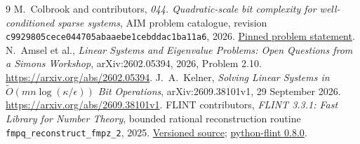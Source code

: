 \documentclass[11pt]{article}
\newcommand{\softO}{\widetilde O}
\begin{document}
\begin{thebibliography}{9}
M.~Colbrook and contributors,
\emph{044. Quadratic-scale bit complexity for well-conditioned sparse systems},
AIM problem catalogue, revision
\texttt{c9929805cece044705abaaebe1cebddac1ba11a6}, 2026.
\href{https://github.com/MColbrook/AIM/blob/c9929805cece044705abaaebe1cebddac1ba11a6/problems/044-sparse-linear-solve-bit-complexity.md}{Pinned problem statement}.
N.~Amsel et al.,
\emph{Linear Systems and Eigenvalue Problems: Open Questions from a Simons Workshop},
arXiv:2602.05394, 2026, Problem 2.10.
\url{https://arxiv.org/abs/2602.05394}.
J.~A.~Kelner,
\emph{Solving Linear Systems in $\softO(mn\log(\kappa/\epsilon))$ Bit Operations},
arXiv:2609.38101v1, 29 September 2026.
\url{https://arxiv.org/abs/2609.38101v1}.
FLINT contributors,
\emph{FLINT 3.3.1: Fast Library for Number Theory},
bounded rational reconstruction routine
\texttt{fmpq\_reconstruct\_fmpz\_2}, 2025.
\href{https://github.com/flintlib/flint/blob/v3.3.1/src/fmpq/reconstruct_fmpz_2.c}{Versioned source};
\href{https://pypi.org/project/python-flint/0.8.0/}{python-flint 0.8.0}.
\end{thebibliography}
\end{document}
